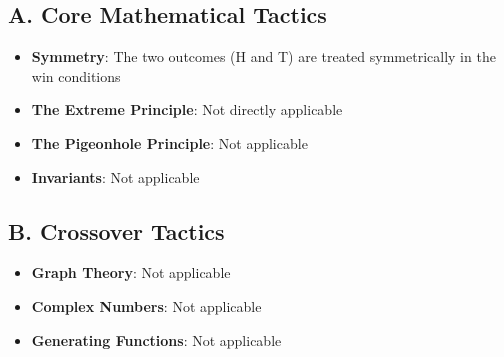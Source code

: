 \documentclass[]{article}
\begin{document}
\begin{tacticalbox}
\subsection*{A. Core Mathematical Tactics}
\begin{itemize}[leftmargin=*]
    \item \textbf{Symmetry}: The two outcomes (H and T) are treated symmetrically in the win conditions
    \item \textbf{The Extreme Principle}: Not directly applicable
    \item \textbf{The Pigeonhole Principle}: Not applicable
    \item \textbf{Invariants}: Not applicable
\end{itemize}

\subsection*{B. Crossover Tactics}
\begin{itemize}[leftmargin=*]
    \item \textbf{Graph Theory}: Not applicable
    \item \textbf{Complex Numbers}: Not applicable
    \item \textbf{Generating Functions}: Not applicable
\end{itemize}
\end{tacticalbox}
\end{document}
